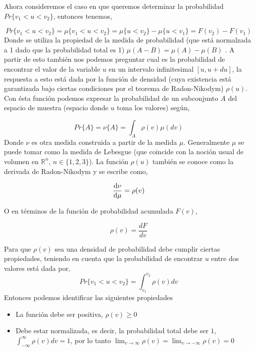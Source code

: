 \documentclass[executivepaper,12pt]{article}
\numberwithin{equation}{section}
\begin{document}
Ahora consideremos el caso en que queremos determinar la probabilidad $Pr\{ v_1 <  u < v_2 \}$, entonces tenemos,

\begin{equation}
	Pr\{ v_1 <  u < v_2 \} = \mu \{v_1 <  u < v_2 \}=\mu\{ u < v_2 \} - \mu\{ u < v_1 \} =F(v_2)-F(v_1) 
\end{equation}
Donde se utiliza la propiedad de la medida de probabilidad (que está normalzada a 1 dado que la probabilidad total es 1) $\mu(A-B)=\mu(A)-\mu(B)$ \parencite{billingsley2008}. A partir de esto también nos podemos preguntar cual es la probabilidad de encontrar el valor de la variable $u$ en un intervalo infinitesimal $[u,u+du]$, la respuesta a esto está dada por la función de densidad (cuya existencia está garantizada bajo ciertas condiciones por el teorema de Radon-Nikodym) $\rho(u)$. Con ésta función podemos expresar la probabilidad de un subconjunto $A$ del espacio de muestra (espacio donde $u$ toma los valores) según,

\begin{equation}
	Pr\{ A \}=\nu\{A\}=\int_{A} \rho(v) \mu (dv)
\end{equation} 
Donde $\nu$ es otra medida construida a partir de la medida $\mu$. Generalmente $\mu$ se puede tomar como la medida de Lebesgue (que coincide con la noción usual de volumen en $\mathbb{R} ^n$, $n \in \{1,2,3\}$). La función $\rho(u)$ también se conoce como la derivada de Radon-Nikodym y se escribe como, 

\begin{equation*}
	\derivative{\nu}{\mu}=\rho(v)
\end{equation*}
 
O en términos de la función de probabilidad acumulada $F(v)$,

\begin{equation}
	\rho(v)=\frac{dF}{dv}
\end{equation}
 
Para que $\rho(v)$ sea una densidad de probabilidad debe cumplir ciertas propiedades, teniendo en cuenta que la probabilidad de encontrar $u$ entre dos valores está dada por,
\begin{equation}
	Pr\{v_1<u<v_2\} = \int_{v_1}^{v_2} \rho(v) dv
\end{equation}
Entonces podemos identificar las siguientes propiedades
\begin{itemize}
	\item La función debe ser positiva, $\rho(v)\geq 0$
	
	\item Debe estar normalizada, es decir, la probabilidad total debe ser $1$,  $\int_{-\infty}^{\infty} \rho(v) dv =1$, por lo tanto $\lim_{v\to\infty} \rho(v)=\lim_{v\to-\infty}\rho(v)=0$
\end{itemize}
\end{document}
